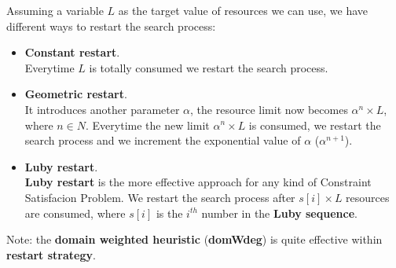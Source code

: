 Assuming a variable $L$ as the target value of resources we can use, we have different ways to restart the search process:
\begin{itemize}
    \renewcommand{\labelitemi}{-}
    \item \textbf{Constant restart}. \\
    Everytime $L$ is totally consumed we restart the search process.
    \item \textbf{Geometric restart}. \\
    It introduces another parameter $\alpha$, the resource limit now becomes $\alpha^{n} \times L$, where $n \in N$. Everytime the new limit $\alpha^{n} \times L$
    is consumed, we restart the search process and we increment the exponential value of $\alpha$ ($\alpha^{n + 1}$).
    \item \textbf{Luby restart}. \\
    \textbf{Luby restart} is the more effective approach for any kind of Constraint Satisfacion Problem. We restart the search process after $s[i] \times L$
    resources are consumed, where $s[i]$ is the $i^{th}$ number in the \textbf{Luby sequence}.
\end{itemize}

Note: the \textbf{domain weighted heuristic} (\textbf{domWdeg}) is quite effective within \textbf{restart strategy}.